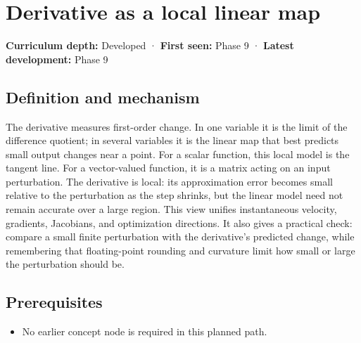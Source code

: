 \hypertarget{appendix-7bc181935c42}{}\label{referencestart:appendix-7bc181935c42}
\section{Derivative as a local linear map}\label{appendix-7bc181935c42-derivative-as-a-local-linear-map}

\hypertarget{appendix-7bc181935c42-derivative-as-a-local-linear-map}{}

\textbf{Curriculum depth:} Developed · \textbf{First seen:} Phase 9 · \textbf{Latest development:} Phase 9

\begin{allmightroledefinition}

\subsection{Definition and mechanism}\label{appendix-7bc181935c42-definition-and-mechanism}

\hypertarget{appendix-7bc181935c42-definition-and-mechanism}{}

The derivative measures first-order change. In one variable it is the limit of the difference quotient; in several variables it is the linear map that best predicts small output changes near a point. For a scalar function, this local model is the tangent line. For a vector-valued function, it is a matrix acting on an input perturbation. The derivative is local: its approximation error becomes small relative to the perturbation as the step shrinks, but the linear model need not remain accurate over a large region. This view unifies instantaneous velocity, gradients, Jacobians, and optimization directions. It also gives a practical check: compare a small finite perturbation with the derivative's predicted change, while remembering that floating-point rounding and curvature limit how small or large the perturbation should be.

\end{allmightroledefinition}

\subsection{Prerequisites}\label{appendix-7bc181935c42-prerequisites}

\hypertarget{appendix-7bc181935c42-prerequisites}{}

\begin{itemize}
\tightlist
\item
  No earlier concept node is required in this planned path.
\end{itemize}

